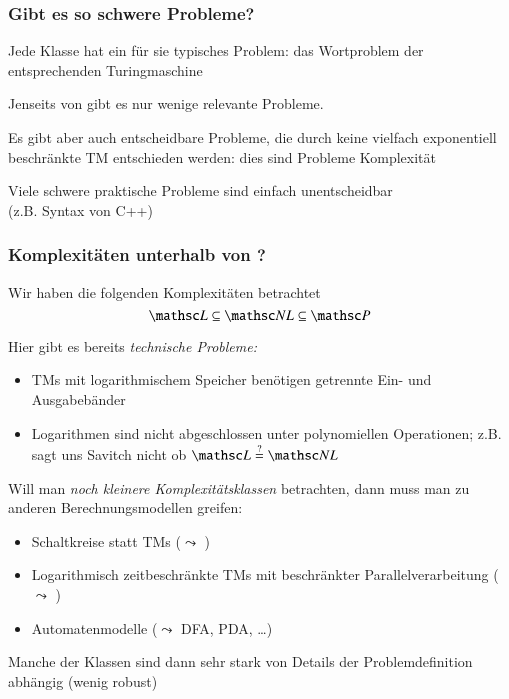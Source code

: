 \documentclass[onlymath]{beamer}
\begin{document}
\begin{frame}\frametitle{Gibt es so schwere Probleme?}\pause

Jede Klasse hat ein für sie typisches Problem: das Wortproblem
der entsprechenden Turingmaschine
\bigskip

Jenseits von \ExpSpace gibt es nur wenige relevante Probleme.\medskip

\pause

Es gibt aber auch entscheidbare Probleme, die durch keine vielfach exponentiell 
beschränkte TM entschieden werden: dies sind Probleme 
Komplexität\medskip

\pause

Viele schwere praktische Probleme sind einfach unentscheidbar\\[-1ex]
{\tiny (z.B. Syntax von C++)}

\end{frame}

\begin{frame}\frametitle{Komplexitäten unterhalb von \PTime?}

Wir haben die folgenden Komplexitäten betrachtet
\[\LogSpace \subseteq \NLogSpace \subseteq \PTime\]

Hier gibt es bereits \emph{technische Probleme:}
\begin{itemize}
\item TMs mit logarithmischem Speicher benötigen getrennte Ein- und Ausgabebänder
\item Logarithmen sind nicht abgeschlossen unter polynomiellen Operationen;
z.B. sagt uns Savitch \alert{nicht} ob $\LogSpace \stackrel{?}{=} \NLogSpace$
\end{itemize}\pause\smallskip

Will man \emph{noch kleinere Komplexitätsklassen} betrachten, dann muss man zu anderen
Berechnungsmodellen greifen:
\begin{itemize}
\item Schaltkreise statt TMs ($\leadsto$ )
\item Logarithmisch zeitbeschränkte TMs mit beschränkter Parallelverarbeitung ($\leadsto$ )
\item Automatenmodelle ($\leadsto$ DFA, PDA, \ldots)
\end{itemize}
Manche der Klassen sind dann sehr stark von Details der Problemdefinition
abhängig (wenig robust)

\end{frame}
\end{document}
